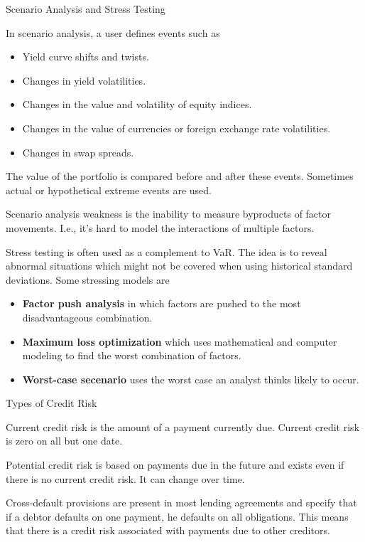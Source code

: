 \documentclass[../custom]{flashcards}
\newcommand{\studyArea}{Risk Management}
\begin{document}
\begin{flashcard}[\studyArea]{Scenario Analysis and Stress Testing}
    \begin{flushleft}
        In scenario analysis, a user defines events such as
        \begin{itemize}[parsep=1pt,itemsep=1pt]
            \item Yield curve shifts and twists.
            \item Changes in yield volatilities.
            \item Changes in the value and volatility of equity indices.
            \item Changes in the value of currencies or foreign exchange rate volatilities.
            \item Changes in swap spreads.
        \end{itemize}
        The value of the portfolio is compared before and after these events. Sometimes actual or hypothetical extreme events are used.\newline

        Scenario analysis weakness is the inability to measure byproducts of factor movements. I.e., it's hard to model the interactions of multiple factors.\newline

        Stress testing is often used as a complement to VaR. The idea is to reveal abnormal situations which might not be covered when using historical standard deviations. Some stressing models are
        \begin{itemize}[parsep=1pt,itemsep=1pt]
            \item \textbf{Factor push analysis} in which factors are pushed to the most disadvantageous combination.
            \item \textbf{Maximum loss optimization} which uses mathematical and computer modeling to find the worst combination of factors.
            \item \textbf{Worst-case secenario} uses the worst case an analyst thinks likely to occur.
        \end{itemize}
    \end{flushleft}
\end{flashcard}

\begin{flashcard}[\studyArea]{Types of Credit Risk}
    \begin{flushleft}
        Current credit risk is the amount of a payment currently due. Current credit risk is zero on all but one date.\newline

        Potential credit risk is based on payments due in the future and exists even if there is no current credit risk. It can change over time.\newline

        Cross-default provisions are present in most lending agreements and specify that if a debtor defaults on one payment, he defaults on all obligations. This means that there is a credit risk associated with payments due to other creditors.
    \end{flushleft}
\end{flashcard}
\end{document}
